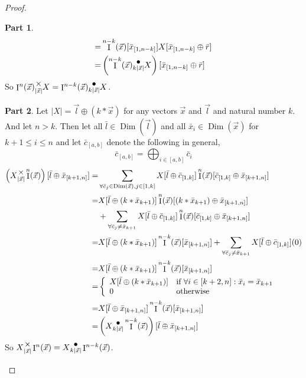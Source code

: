 \documentclass[12pt]{book}
\theoremstyle{plain}
\theoremstyle{definition}
\theoremstyle{ppart}
\newtheorem{ppart}{Part}
\theoremstyle{case}
\theoremstyle{solution}
\DeclareMathOperator{\Dim}{Dim}
\DeclareMathOperator{\Ident}{I}
\newcommand{\mmult}[1]{\text{\raisebox{1ex}{$\underset{#1}{\times}$}}}
\newcommand{\dmult}[1]{\text{\raisebox{1ex}{$\underset{#1}{\,\bullet\,}$}}}
\newcommand{\shape}[1]{\left|#1\right|}
\begin{document}
\begin{landscape}
\begin{proof}
\begin{ppart}
\begin{align*}
  =& \Ident^{n-k}(\vec{x})[\bar{x}_{[1,n-k]}] X[\bar{x}_{[1,n-k]} \oplus \bar{r}] \\
  =& \left(\Ident^{n-k}(\vec{x}) \dmult{k\shape{\vec{x}}} X\right)[\bar{x}_{[1,n-k]} \oplus \bar{r}]
\end{align*}
So $\Ident^n(\vec{x}) \mmult{\shape{\vec{x}}} X = \Ident^{n-k}(\vec{x}) \dmult{k\shape{\vec{x}}} X$.
\end{ppart}
\begin{ppart}
Let $\shape{X} = \vec{l} \oplus (k * \vec{x})$ for any vectors $\vec{x}$ and $\vec{l}$
and natural number $k$. And let $n > k$.
Then let all $\bar{l} \in \Dim(\vec{l})$ and all $\bar{x}_i \in \Dim(\vec{x})$ for $k+1 \le i \le n$ and let
$\bar{c}_{[a,b]}$ denote the following in general,
\[ \bar{c}_{[a,b]} = \bigoplus_{i \in [a,b]} \bar{c}_i \]
\begin{align*}
  \left(X \mmult{\shape{\vec{x}}} \Ident^n(\vec{x})\right)[\bar{l} \oplus \bar{x}_{[k+1,n]}]
  =& \sum_{\forall \bar{c}_j \in \Dim(\vec{x}), j \in [1, k]} X[\bar{l} \oplus \bar{c}_{[1,k]}] \Ident^n(\vec{x})[\bar{c}_{[1,k]} \oplus \bar{x}_{[k+1,n]}] \\
  =& X[\bar{l} \oplus (k*\bar{x}_{k+1})] \Ident^n(\vec{x})[(k*\bar{x}_{k+1}) \oplus \bar{x}_{[k+1,n]}] \\
   & +\sum_{\forall \bar{c}_j \ne \bar{x}_{k+1}} X[\bar{l} \oplus \bar{c}_{[1,k]}] \Ident^n(\vec{x})[\bar{c}_{[1,k]} \oplus \bar{x}_{[k+1,n]}] \\
  =& X[\bar{l} \oplus (k*\bar{x}_{k+1})] \Ident^{n-k}(\vec{x})[\bar{x}_{[k+1,n]}]
     +\sum_{\forall \bar{c}_j \ne \bar{x}_{k+1}} X[\bar{l} \oplus \bar{c}_{[1,k]}] (0) \\
  =& X[\bar{l} \oplus (k*\bar{x}_{k+1})] \Ident^{n-k}(\vec{x})[\bar{x}_{[k+1,n]}] \\
  =& 
    \left\{
      \begin{array}{ll}
        X[\bar{l} \oplus (k * \bar{x}_{k+1})] & \mbox{if } \forall i \in [k+2,n] : \bar{x}_i = \bar{x}_{k+1} \\
        0 & \mbox{otherwise}
      \end{array}
    \right. \\
  =& X[\bar{l} \oplus \bar{x}_{[k+1,n]}] \Ident^{n-k}(\vec{x})[\bar{x}_{[k+1,n]}] \\
  =& \left(X \dmult{k\shape{\vec{x}}} \Ident^{n-k}(\vec{x})\right)[\bar{l} \oplus \bar{x}_{[k+1,n]}]
\end{align*}
So $X \mmult{\shape{\vec{x}}} \Ident^n(\vec{x}) = X \dmult{k\shape{\vec{x}}} \Ident^{n-k}(\vec{x})$.
\end{ppart}
\end{proof}
\end{landscape}
\end{document}
